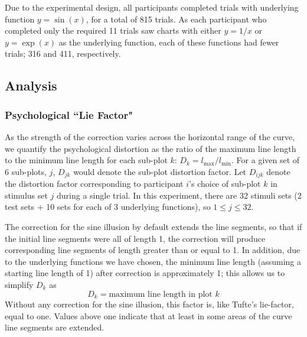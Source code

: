 \documentclass[11pt]{isuthesis}\usepackage[]{graphicx}\usepackage[]{color}
\begin{document}
Due to the experimental design, all participants completed trials with underlying function $y=\sin(x)$, for a total of 815 trials. As each participant who completed only the required 11 trials saw charts with either $y=1/x$ or $y=\exp(x)$ as the underlying function, each of these functions had fewer trials; 316 and 411, respectively. 


\subsection{Analysis}
\subsubsection*{Psychological ``Lie Factor"}
As the strength of the correction varies across the horizontal range of the curve, we quantify the psychological distortion as the ratio of the maximum line length to the minimum line length for each sub-plot $k$: $D_k = l_\text{max}/l_\text{min}$. For a given set of 6 sub-plots, $j$, $D_{jk}$ would denote the sub-plot distortion factor. Let $D_{ijk}$ denote the distortion factor corresponding to participant $i$'s choice of sub-plot $k$ in stimulus set $j$ during a single trial. In this experiment, there are 32 stimuli sets (2 test sets + 10 sets for each of 3 underlying functions), so $1 \leq j \leq 32$. 

The correction for the sine illusion by default extends the line segments, so that if the initial line segments were all of length 1, the correction will produce corresponding line segments of length greater than or equal to 1. In addition, due to the underlying functions we have chosen, the minimum line length (assuming a starting line length of 1) after correction is approximately 1; this allows us to simplify $D_k$ as $$D_k = \text{maximum line length in plot } k$$
Without any correction for the sine illusion, this factor is, like  Tufte's lie-factor, equal to one. Values above one indicate that at least in some areas of the curve line segments are extended.
\end{document}
